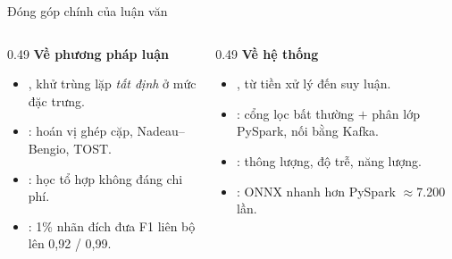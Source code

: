\documentclass[aspectratio=169, 11pt]{beamer}
\begin{document}
\begin{frame}{Đóng góp chính của luận văn}
  \begin{columns}[T]
    \begin{column}{0.49\textwidth}
      \textbf{Về phương pháp luận}
      \begin{itemize}\small
        \item {}, khử trùng lặp
              \emph{tất định} ở mức đặc trưng.
        \item {}: hoán vị ghép cặp, Nadeau--Bengio, TOST.
        \item {}: học tổ hợp không đáng chi phí.
        \item {}: 1\% nhãn đích đưa F1
              liên bộ lên 0,92 / 0,99.
      \end{itemize}
    \end{column}
    \begin{column}{0.49\textwidth}
      \textbf{Về hệ thống}
      \begin{itemize}\small
        \item {}, từ tiền xử lý đến suy
              luận.
        \item {}: cổng lọc bất thường $+$ phân
              lớp PySpark, nối bằng Kafka.
        \item {}: thông lượng, độ trễ, năng lượng.
        \item {}: ONNX nhanh hơn PySpark
              $\approx$7.200 lần.
      \end{itemize}
    \end{column}
  \end{columns}
\end{frame}
\end{document}
